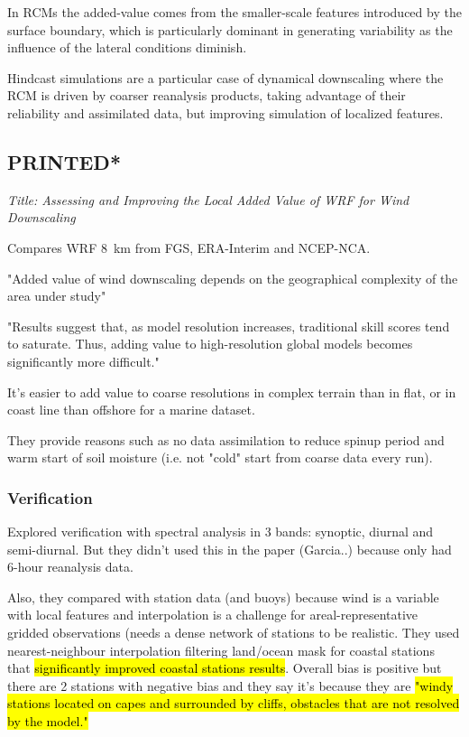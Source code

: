 \documentclass[12pt,a4paper]{article}
\begin{document}
In RCMs the added-value comes from the smaller-scale features introduced by the surface boundary, which is particularly dominant in generating variability as the influence of the lateral conditions diminish. 

Hindcast simulations are a particular case of dynamical downscaling where the RCM is driven by coarser reanalysis products, taking advantage of their reliability and assimilated data, but improving simulation of localized features.

\subsection{\cite{Garcia-Diez2015} PRINTED*}

\textit{Title: Assessing and Improving the Local Added Value of WRF for Wind Downscaling}

Compares WRF 8~km from FGS, ERA-Interim and NCEP-NCA. 

"Added value of wind downscaling depends on the geographical complexity of the area under study" 

"Results suggest that, as model resolution increases, traditional skill scores tend to saturate. Thus, adding value to high-resolution global models becomes significantly more difficult." 

It's easier to add value to coarse resolutions in complex terrain than in flat, or in coast line than offshore for a marine dataset. 

They provide reasons such as no data assimilation to reduce spinup period and warm start of soil moisture (i.e. not "cold" start from coarse data every run).

\subsubsection{Verification}

Explored verification with spectral analysis in 3 bands: synoptic, diurnal and semi-diurnal. But they didn't used this in the paper (Garcia..) because only had 6-hour reanalysis data.

Also, they compared with station data (and buoys) because wind is a variable with local features and interpolation is a challenge for areal-representative gridded observations (needs a dense network of stations to be realistic. They used nearest-neighbour interpolation filtering land/ocean mask for coastal stations that \hl{significantly improved coastal stations results}. Overall bias is positive but there are 2 stations with negative bias and they say it's because they are \hl{"windy stations located on capes and surrounded by cliffs, obstacles that are not resolved by the model."}
\end{document}
